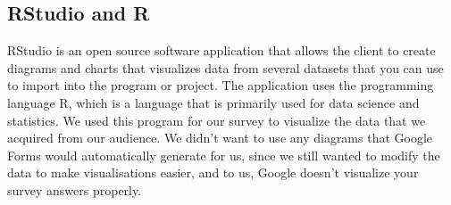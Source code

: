 \subsection{RStudio and R}
RStudio is an open source software application that allows the client to create diagrams and charts that visualizes data from several datasets that you can use to import into the program or project. The application uses the programming language R, which is a language that is primarily used for data science and statistics. We used this program for our survey to visualize the data that we acquired from our audience. We didn't want to use any diagrams that Google Forms would automatically generate for us, since we still wanted to modify the data to make visualisations easier, and to us, Google doesn't visualize your survey answers properly.